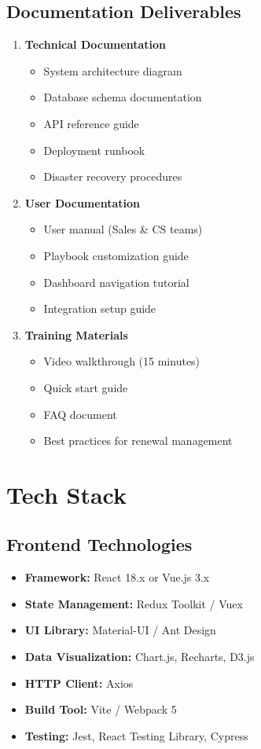 \documentclass[12pt,a4paper]{article}
\begin{document}
\subsection{Documentation Deliverables}
\begin{enumerate}
    \item \textbf{Technical Documentation}
    \begin{itemize}
        \item System architecture diagram
        \item Database schema documentation
        \item API reference guide
        \item Deployment runbook
        \item Disaster recovery procedures
    \end{itemize}
    \item \textbf{User Documentation}
    \begin{itemize}
        \item User manual (Sales \& CS teams)
        \item Playbook customization guide
        \item Dashboard navigation tutorial
        \item Integration setup guide
    \end{itemize}
    \item \textbf{Training Materials}
    \begin{itemize}
        \item Video walkthrough (15 minutes)
        \item Quick start guide
        \item FAQ document
        \item Best practices for renewal management
    \end{itemize}
\end{enumerate}

\section{Tech Stack}

\subsection{Frontend Technologies}
\begin{itemize}
    \item \textbf{Framework:} React 18.x or Vue.js 3.x
    \item \textbf{State Management:} Redux Toolkit / Vuex
    \item \textbf{UI Library:} Material-UI / Ant Design
    \item \textbf{Data Visualization:} Chart.js, Recharts, D3.js
    \item \textbf{HTTP Client:} Axios
    \item \textbf{Build Tool:} Vite / Webpack 5
    \item \textbf{Testing:} Jest, React Testing Library, Cypress
\end{itemize}
\end{document}
